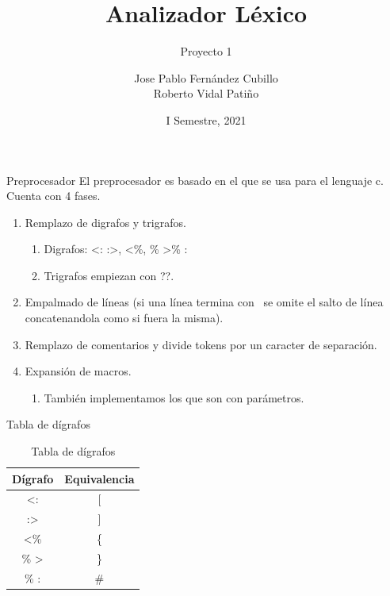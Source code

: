 \documentclass[aspectratio=43]{beamer}
\title{Analizador Léxico}
\subtitle{Proyecto 1}
\author[Jose P. Fernández, Roberto Vidal]{
    Jose Pablo Fernández Cubillo%
    \\%
    Roberto Vidal Patiño%
}
\institute[Tecnológico de Costa Rica]{
    Tecnológico de Costa Rica%
    \\%
    Compiladores e Intérpretes%
}
\date{I Semestre, 2021}
\begin{document}
    
    \frame{\titlepage}

    \begin{frame}{Preprocesador}
            El preprocesador es basado en el que se usa para el lenguaje c. Cuenta con 4 fases. \\
            \begin{enumerate}
                \item Remplazo de digrafos y trigrafos.
                \begin{enumerate}
                    \item Digrafos: \textless : :\textgreater, \textless \%, \% \textgreater \% :
                    \item Trigrafos empiezan con ??.
                \end{enumerate}
                \item Empalmado de líneas (si una línea termina con \ se omite el salto de línea concatenandola como si fuera la misma).
                \item Remplazo de comentarios y divide tokens por un caracter de separación.
                \item Expansión de macros.
                \begin{enumerate}
                    \item También implementamos los que son con parámetros.
                \end{enumerate}
            \end{enumerate}
    \end{frame}

    \begin{frame}{Tabla de dígrafos}
        \begin{table}
            \begin{tabular}{c | c}
            Dígrafo & Equivalencia \\
            \hline \hline
                \textless : & [ \\
                :\textgreater & ] \\
                \textless \% & \{ \\
                \% \textgreater & \} \\
                \% : & \# 
            \end{tabular}
            \caption{Tabla de dígrafos}
        \end{table}

    \end{frame}
\end{document}
